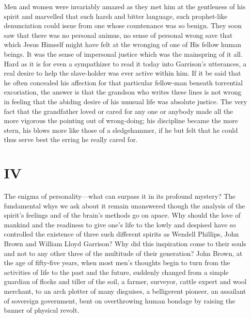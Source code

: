 \documentclass{book}
\begin{document}
Men and women were invariably amazed as they met him at the gentleness of his spirit and marvelled that such harsh and bitter language, such prophet-like denunciation could issue from one whose countenance was so benign. They soon saw that there was no personal animus, no sense of personal wrong save that which Jesus Himself might have felt at the wronging of one of His fellow human beings. It was the sense of impersonal justice which was the mainspring of it all. Hard as it is for even a sympathizer to read it today into Garrison’s utterances, a real desire to help the slave-holder was ever active within him. If it be said that he often concealed his affection for that particular fellow-man beneath torrential excoriation, the answer is that the grandson who writes these lines is not wrong in feeling that the abiding desire of his unusual life was absolute justice. The very fact that the grandfather loved or cared for any one or anybody made all the more vigorous the pointing out of wrong-doing; his discipline became the more stern, his blows more like those of a sledgehammer, if he but felt that he could thus serve best the erring he really cared for.

\section{IV}
The enigma of personality—what can surpass it in its profound mystery? The fundamental whys we ask about it remain unanswered though the analysis of the spirit’s feelings and of the brain’s methods go on apace. Why should the love of mankind and the readiness to give one’s life to the lowly and despised have so controlled the existence of three such different spirits as Wendell Phillips, John Brown and William Lloyd Garrison? Why did this inspiration come to their souls and not to any other three of the multitude of their generation? John Brown, at the age of fifty-five years, when most men’s thoughts begin to turn from the activities of life to the past and the future, suddenly changed from a simple guardian of flocks and tiller of the soil, a farmer, surveyor, cattle expert and wool merchant, to an arch plotter of many disguises, a belligerent pioneer, an assailant of sovereign government, bent on overthrowing human bondage by raising the banner of physical revolt.
\end{document}
